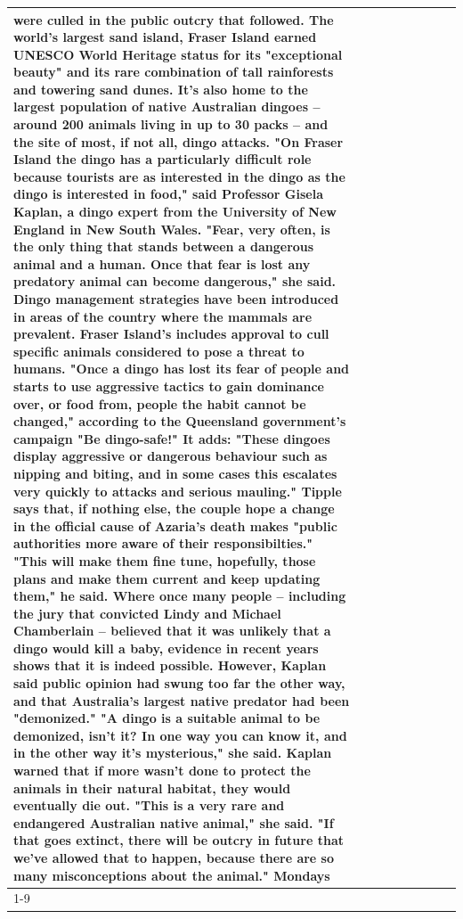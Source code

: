 \begin{table}[H]
\begin{tabular}{lllrlllll}
were culled in the public outcry that followed. The world's largest sand island, Fraser Island earned UNESCO World Heritage status for its "exceptional beauty" and its rare combination of tall rainforests and towering sand dunes. It's also home to the largest population of native Australian dingoes -- around 200 animals living in up to 30 packs -- and the site of most, if not all, dingo attacks. "On Fraser Island the dingo has a particularly difficult role because tourists are as interested in the dingo as the dingo is interested in food," said Professor Gisela Kaplan, a dingo expert from the University of New England in New South Wales. "Fear, very often, is the only thing that stands between a dangerous animal and a human. Once that fear is lost any predatory animal can become dangerous," she said. Dingo management strategies have been introduced in areas of the country where the mammals are prevalent. Fraser Island's includes approval to cull specific animals considered to pose a threat to humans. "Once a dingo has lost its fear of people and starts to use aggressive tactics to gain dominance over, or food from, people the habit cannot be changed," according to the Queensland government's campaign "Be dingo-safe!" It adds: "These dingoes display aggressive or dangerous behaviour such as nipping and biting, and in some cases this escalates very quickly to attacks and serious mauling." Tipple says that, if nothing else, the couple hope a change in the official cause of Azaria's death makes "public authorities more aware of their responsibilties." "This will make them fine tune, hopefully, those plans and make them current and keep updating them," he said. Where once many people -- including the jury that convicted Lindy and Michael Chamberlain -- believed that it was unlikely that a dingo would kill a baby, evidence in recent years shows that it is indeed possible. However, Kaplan said public opinion had swung too far the other way, and that Australia's largest native predator had been "demonized." "A dingo is a suitable animal to be demonized, isn't it? In one way you can know it, and in the other way it's mysterious," she said. Kaplan warned that if more wasn't done to protect the animals in their natural habitat, they would eventually die out. "This is a very rare and endangered Australian native animal," she said. "If that goes extinct, there will be outcry in future that we've allowed that to happen, because there are so many misconceptions about the animal." Mondays \\
\cline{1-9}

\end{tabular}
\end{table}
